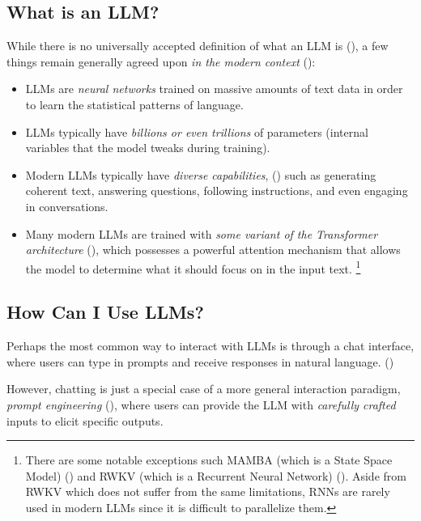 \documentclass{article} %
\begin{document}
\subsection{What is an LLM?}
While there is no universally accepted definition of what an LLM is (\cite{Zhao-et-al-2023}),
a few things remain generally agreed upon \textit{in the modern context} (\cite{Zhao-et-al-2023, Sanderson-2025, Karpathy-2025}):
\begin{itemize}
    \item LLMs are \textit{neural networks} trained on massive amounts of text data in order to learn the statistical patterns of language.
    \item LLMs typically have \textit{billions or even trillions} of parameters (internal variables that the model tweaks during training).
    \item Modern LLMs typically have \textit{diverse capabilities}, (\cite{Brown-et-al-2020})
        such as generating coherent text, answering questions, following instructions, 
        and even engaging in conversations.
    \item Many modern LLMs are trained with \textit{some variant of the Transformer architecture} (\cite{Vaswani-et-al-2017}),
        which possesses a powerful attention mechanism that allows the model to determine what it should focus on in the input text.
        \footnote{
            There are some notable exceptions such MAMBA (which is a State Space Model) (\cite{Gu-and-Dao-2024})
            and RWKV (which is a Recurrent Neural Network) (\cite{Peng-et-al-2023}).
            Aside from RWKV which does not suffer from the same limitations, 
            RNNs are rarely used in modern LLMs since it is difficult to parallelize them.
        }
\end{itemize}

\subsection{How Can I Use LLMs?}

Perhaps the most common way to interact with LLMs is through a chat interface,
where users can type in prompts and receive responses in natural language. 
(\cite{ChatGPT-2022,Anthropic-2025,Deepseek-2024})

However, chatting is just a special case of a more general interaction paradigm,
\textit{prompt engineering} (\cite{Karpathy-2025}),
where users can provide the LLM with \textit{carefully crafted} inputs to elicit specific outputs.
\end{document}
